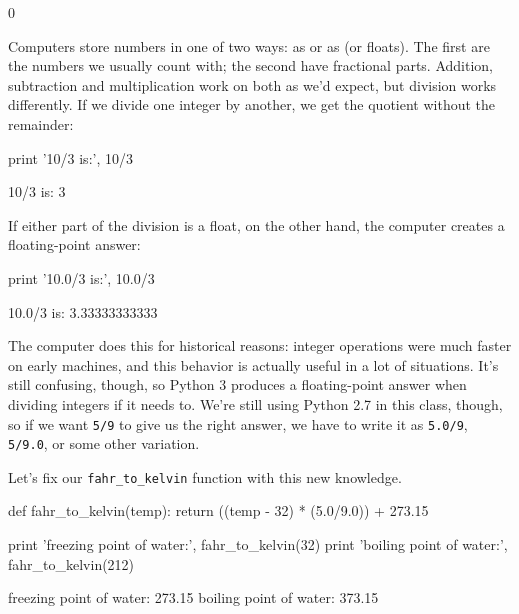 \begin{VerbOut}
0
\end{VerbOut}

Computers store numbers in one of two ways: as
 or as  (or floats). The first are the numbers we usually count with;
the second have fractional parts. Addition, subtraction and
multiplication work on both as we'd expect, but division works
differently. If we divide one integer by another, we get the quotient
without the remainder:

\begin{VerbIn}
print '10/3 is:', 10/3
\end{VerbIn}

\begin{VerbOut}
10/3 is: 3
\end{VerbOut}

If either part of the division is a float, on the other hand, the
computer creates a floating-point answer:

\begin{VerbIn}
print '10.0/3 is:', 10.0/3
\end{VerbIn}

\begin{VerbOut}
10.0/3 is: 3.33333333333
\end{VerbOut}

The computer does this for historical reasons: integer operations were
much faster on early machines, and this behavior is actually useful in a
lot of situations. It's still confusing, though, so Python 3 produces a
floating-point answer when dividing integers if it needs to. We're still
using Python 2.7 in this class, though, so if we want \texttt{5/9} to
give us the right answer, we have to write it as \texttt{5.0/9},
\texttt{5/9.0}, or some other variation.

Let's fix our \texttt{fahr\_to\_kelvin} function with this new
knowledge.

\begin{VerbIn}
def fahr_to_kelvin(temp):
    return ((temp - 32) * (5.0/9.0)) + 273.15

print 'freezing point of water:', fahr_to_kelvin(32)
print 'boiling point of water:', fahr_to_kelvin(212)
\end{VerbIn}

\begin{VerbOut}
freezing point of water: 273.15
boiling point of water: 373.15
\end{VerbOut}

